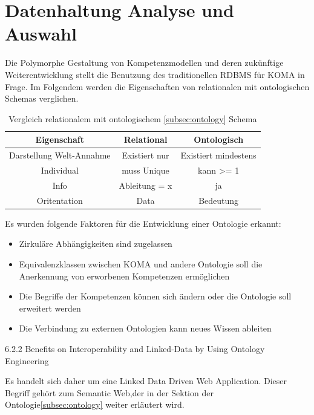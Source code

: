 \documentclass[
12pt,
english,
ngerman,
headsepline,
twoside,
openright,
numbers=noenddot,version=first
]{scrreprt}
\providecommand{\tabularnewline}{\\}
\begin{document}
\section{Datenhaltung Analyse und Auswahl}

Die Polymorphe Gestaltung von Kompetenzmodellen und deren zukünftige Weiterentwicklung stellt die Benutzung des traditionellen RDBMS für KOMA in Frage. Im Folgendem werden die Eigenschaften von relationalen mit ontologischen Schemas verglichen.


\begin{table}
\caption{Vergleich relationalem mit ontologischem \ref{subsec:ontology} Schema}

\centering{}
\begin{tabular}{ccc}
\noalign{\vskip\doublerulesep}
Eigenschaft & Relational & Ontologisch \tabularnewline[\doublerulesep]
\hline\noalign{\vskip\doublerulesep}
Darstellung Welt-Annahme & Existiert nur & Existiert mindestens \tabularnewline[\doublerulesep]
\noalign{\vskip\doublerulesep}
Individual & muss Unique & kann >= 1 \tabularnewline[\doublerulesep]
\noalign{\vskip\doublerulesep}
Info & Ableitung = x & ja \tabularnewline[\doublerulesep]
\noalign{\vskip\doublerulesep}
Oritentation & Data & Bedeutung \tabularnewline[\doublerulesep]

\end{tabular}
\end{table}

Es wurden folgende Faktoren für die Entwicklung einer Ontologie erkannt:
\begin{itemize}
	\item Zirkuläre Abhängigkeiten sind zugelassen
	\item Equivalenzklassen zwischen KOMA und andere Ontologie soll die Anerkennung von erworbenen Kompetenzen ermöglichen
	\item Die Begriffe der Kompetenzen können sich ändern oder die Ontologie soll erweitert werden
	\item Die Verbindung zu externen Ontologien kann neues Wissen ableiten
\end{itemize}

6.2.2 \cite{OntoCloud}Benefits on Interoperability and Linked-Data by Using
Ontology Engineering

Es handelt sich daher um eine \glqq Linked Data Driven Web Application\grqq.%
Dieser Begriff gehört zum \glqq Semantic Web\grqq,der in der Sektion der Ontologie\ref{subsec:ontology} weiter erläutert wird.
\end{document}

